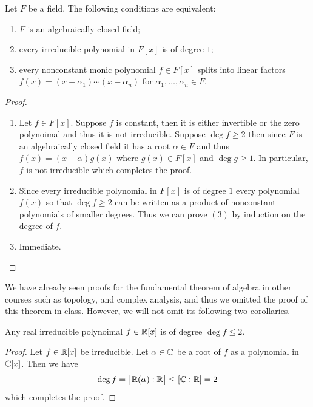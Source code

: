 \documentclass[11pt,a4paper]{article}
\begin{document}
\begin{proposition}
  Let $F$ be a field.
  The following conditions are equivalent:
  \begin{enumerate}
    \item[(1)] $F$ is an algebraically closed field;
    \item[(2)] every irreducible polynomial in $F[x]$ is of degree $1$;
    \item[(3)] every nonconstant monic polynomial $f \in F[x]$ splits into
      linear factors $f(x) = (x-\alpha_1)\cdots(x-\alpha_n)$ for
      $\alpha_1,\dots,\alpha_n \in F$.
  \end{enumerate}
\end{proposition}
\begin{proof} \phantom{}
  \begin{enumerate}
    \item[($1 \to 2$)] Let $f \in F[x]$.
      Suppose $f$ is constant,
      then it is either invertible or the zero polynoimal
      and thus it is not irreducible.
      Suppose $\deg f \geq 2$ then since $F$ is an algebraically closed field
      it has a root $\alpha \in F$ and thus $f(x) = (x - \alpha) g(x)$
      where $g(x) \in F[x]$ and $\deg g \geq 1$.
      In particular, $f$ is not irreducible which completes the proof.
    \item[($2 \to 3$)] Since every irreducible polynomial in $F[x]$ is
      of degree $1$ every polynomial $f(x)$ so that $\deg f \geq 2$
      can be written as a product of nonconstant polynomials of smaller
      degrees.
      Thus we can prove $(3)$ by induction on the degree of $f$.
    \item[($3 \to 1$)] Immediate.
  \end{enumerate}
\end{proof}

\begin{remark}
  We have already seen proofs for the
  fundamental theorem of algebra in other courses such as
  topology, and complex analysis, and thus we omitted the proof of this
  theorem in class.
  However, we will not omit its following two corollaries.
\end{remark}

\begin{corollary}
  Any real irreducible polynoimal $f \in \mathbb{R}[x]$ is of degree $\deg f \le 2$.
\end{corollary}
\begin{proof}
  Let $f \in \mathbb{R}[x]$ be irreducible.
  Let $\alpha \in \mathbb{C}$ be a root of $f$ as a polynomial in $\mathbb{C}[x]$.
  Then we have
  \[
    \deg f = \left[\mathbb{R}(\alpha) : \mathbb{R}\right] \le \left[\mathbb{C} : \mathbb{R}\right] = 2
  \]
  which completes the proof.
\end{proof}
\end{document}
